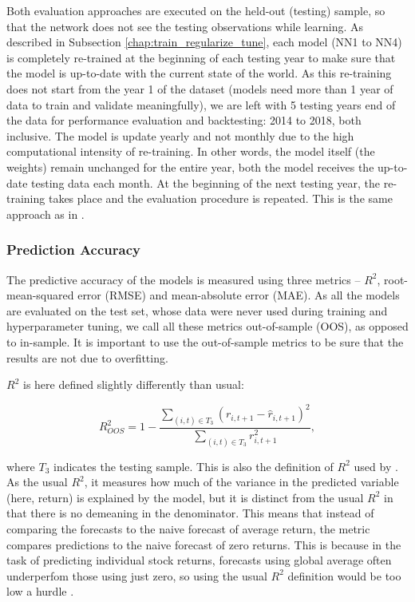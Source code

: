 		Both evaluation approaches are executed on the held-out (testing) sample, so that the network does not see the testing observations while learning. As described in Subsection \ref{chap:train_regularize_tune}, each model (NN1 to NN4) is completely re-trained at the beginning of each testing year to make sure that the model is up-to-date with the current state of the world. As this re-training does not start from the year 1 of the dataset (models need more than 1 year of data to train and validate meaningfully), we are left with 5 testing years end of the data for performance evaluation and backtesting: 2014 to 2018, both inclusive. The model is update yearly and not monthly due to the high computational intensity of re-training. In other words, the model itself (the weights) remain unchanged for the entire year, both the model receives the up-to-date testing data each month. At the beginning of the next testing year, the re-training takes place and the evaluation procedure is repeated. This is the same approach as in \cite{gu2020empirical, tobek2020does}.
		
		\subsubsection{Prediction Accuracy} 
		
			The predictive accuracy of the models is measured using three metrics – $R^2$, root-mean-squared error (RMSE) and mean-absolute error (MAE). As all the models are evaluated on the test set, whose data were never used during training and hyperparameter tuning, we call all these metrics out-of-sample (OOS), as opposed to in-sample. It is important to use the out-of-sample metrics to be sure that the results are not due to overfitting. 
			
			$R^2$ is here defined slightly differently than usual:
			
			\begin{equation*}
				R^2_{OOS} = 1 - \frac{ \sum_{(i,t)\in T_3} \left(r_{i,t+1}-	\hat{r}_{i, t+1}\right) ^2}{\sum_{(i,t)\in T_3} r_{i,t+1}^2}, 		
			\end{equation*}
			
			where $T_3$ indicates the testing sample. This is also the definition of $R^2$ used by \cite{gu2020empirical}. As the usual $R^2$, it measures how much of the variance in the predicted variable (here, return) is explained by the model, but it is distinct from the usual $R^2$ in that there is no demeaning in the denominator. This means that instead of comparing the forecasts to the naive forecast of average return, the metric compares predictions to the naive forecast of zero returns. This is because in the task of predicting individual stock returns, forecasts using global average often underperfom those using just zero, so using the usual $R^2$ definition would be too low a hurdle \citep{gu2020empirical}. 
			

